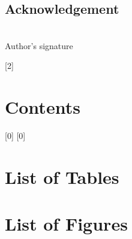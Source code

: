 \documentclass[12pt, a4paper, unicode]{report}
\begin{document}
\section*{Acknowledgement}
\lipsum[1-3]

\vspace{5em}
\hfill
\begin{minipage}[t][][t]{16em}%
  \begin{center}%
    \dotfill \\
    Author's signature
  \end{center}%
\end{minipage}%
\clearpage

[2]{\chapter*{Contents}} 
[0]{}
[0]{}
\thispagestyle{empty}   %

\chapter*{List of Tables}
\thispagestyle{empty}   %

\chapter*{List of Figures}
\thispagestyle{empty}   %

\cleardoublepage\pagestyle{plain}   %

\end{document}
